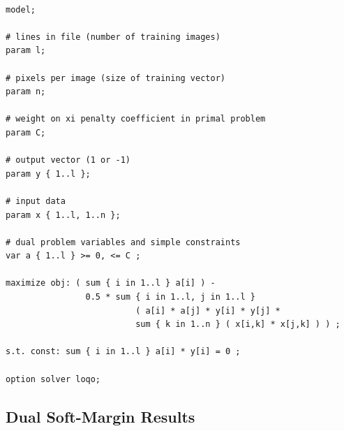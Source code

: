 \documentclass{article}
\begin{document}
\begin{verbatim}

model;

# lines in file (number of training images)
param l;

# pixels per image (size of training vector)
param n;

# weight on xi penalty coefficient in primal problem
param C;

# output vector (1 or -1)
param y { 1..l };

# input data
param x { 1..l, 1..n };

# dual problem variables and simple constraints
var a { 1..l } >= 0, <= C ;

maximize obj: ( sum { i in 1..l } a[i] ) -
                0.5 * sum { i in 1..l, j in 1..l }
                          ( a[i] * a[j] * y[i] * y[j] *
                          sum { k in 1..n } ( x[i,k] * x[j,k] ) ) ;

s.t. const: sum { i in 1..l } a[i] * y[i] = 0 ;

option solver loqo;

\end{verbatim}

\subsection{Dual Soft-Margin Results}
\end{document}
